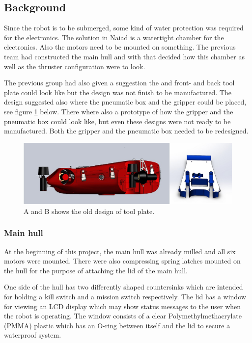 \subsection{Background} %
Since the robot is to be submerged, some kind of water protection was required for the electronics. The solution in Naiad is a watertight chamber for the electronics. Also the motors need to be mounted on something. The previous team had constructed the main hull and with that decided how this chamber as well as the thruster configuration were to look. 

The previous group had also given a suggestion  the and front- and back tool plate could look like but the design was not finish to be manufactured. The design suggested also where the pneumatic box and the gripper could be placed, see figure \ref{Toolplate} below. There where also a prototype of how the gripper and the pneumatic box could look like, but even these designs were not ready to be manufactured. Both the gripper and the pneumatic box needed to be redesigned.

	\begin{figure}[!ht]
	\begin{center}
		\includegraphics[width=150mm]{./images/mechanics/Naiadassembly.JPG}
		\caption{A and B shows the old design of tool plate.}
		\label{Toolplate}
	\end{center}
	\end{figure}

	\subsubsection{Main hull} %
	\noindent At the beginning of this project, the main hull was already milled and all six motors were mounted. There were also compressing spring latches mounted on the hull for the purpose of attaching the lid of the main hull. 

One side of the hull has two differently shaped countersinks which are intended for holding a kill switch and a mission switch respectively. The lid has a window for viewing an LCD display which may show status messages to the user when the robot is operating. The window consists of a clear Polymethylmethacrylate (PMMA) plastic which has an O-ring between itself and the lid to secure a waterproof system. 

